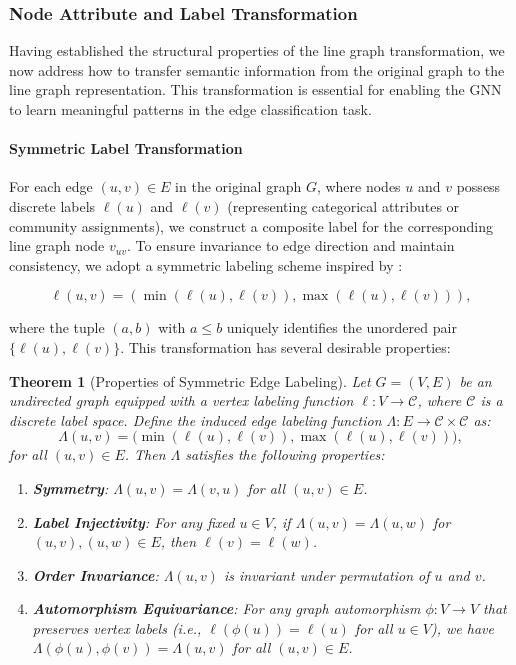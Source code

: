 \documentclass[pdflatex,sn-mathphys-num]{sn-jnl}%
\theoremstyle{thmstyleone}%
\newtheorem{theorem}{Theorem}%
\theoremstyle{thmstyletwo}%
\theoremstyle{thmstylethree}%
\theoremstyle{plain} %
\theoremstyle{definition} %
\theoremstyle{remark} %
\theoremstyle{plain} %
\begin{document}
\subsubsection{Node Attribute and Label Transformation}
\label{subsec:attribute_transformation}

Having established the structural properties of the line graph transformation, we now address how to transfer semantic information from the original graph to the line graph representation. This transformation is essential for enabling the GNN to learn meaningful patterns in the edge classification task. 

\paragraph{Symmetric Label Transformation}
    
For each edge $(u, v) \in E$ in the original graph $G$, where nodes $u$ and $v$ possess discrete labels $\ell(u)$ and $\ell(v)$ (representing categorical attributes or community assignments), we construct a composite label for the corresponding line graph node $v_{uv}$. To ensure invariance to edge direction and maintain consistency, we adopt a symmetric labeling scheme inspired by \cite{cai2021line}:
    
\begin{equation}
\ell(u,v) = \left( \min(\ell(u), \ell(v)), \max(\ell(u), \ell(v)) \right),
\label{eq:sym_label}
\end{equation}
    
where the tuple $(a, b)$ with $a \leq b$ uniquely identifies the unordered pair $\{\ell(u), \ell(v)\}$. This transformation has several desirable properties:
    
\begin{theorem}[Properties of Symmetric Edge Labeling]
\label{thm:symmetric_labeling}
Let $G = (V, E)$ be an undirected graph equipped with a vertex labeling function $\ell: V \to \mathcal{C}$, where $\mathcal{C}$ is a discrete label space. Define the induced edge labeling function $\Lambda: E \to \mathcal{C} \times \mathcal{C}$ as:
\[
\Lambda(u, v) = \bigl(\min(\ell(u), \ell(v)), \max(\ell(u), \ell(v))\bigr),
\]
for all $(u, v) \in E$. Then $\Lambda$ satisfies the following properties:
    
\begin{enumerate}
    \item \textbf{Symmetry}: $\Lambda(u, v) = \Lambda(v, u)$ for all $(u, v) \in E$.
    \item \textbf{Label Injectivity}: For any fixed $u \in V$, if $\Lambda(u, v) = \Lambda(u, w)$ for $(u, v), (u, w) \in E$, then $\ell(v) = \ell(w)$.
    \item \textbf{Order Invariance}: $\Lambda(u, v)$ is invariant under permutation of $u$ and $v$.
    \item \textbf{Automorphism Equivariance}: For any graph automorphism $\phi: V \to V$ that preserves vertex labels (i.e., $\ell(\phi(u)) = \ell(u)$ for all $u \in V$), we have $\Lambda(\phi(u), \phi(v)) = \Lambda(u, v)$ for all $(u, v) \in E$.
\end{enumerate}
\end{theorem}
    
\end{document}
